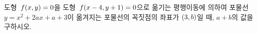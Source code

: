 도형~$f(x{,}\mkern3mu\mathopen{}y)=0$을 도형~$f(x-4{,}\mkern3mu\mathopen{}y+1)=0$으로 옮기는 평행이동에 의하여 포물선~$y=x^2+2ax+a+3$이 옮겨지는 포물선의 꼭짓점의 좌표가 $(3{,}\mkern3mu\mathopen{}b)$일 때, $a+b$의 값을 구하시오. 
